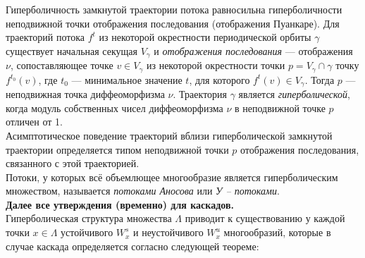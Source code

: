 \noindent Гиперболичность замкнутой траектории потока равносильна гиперболичности неподвижной точки отображения последования (отображения Пуанкаре).
Для траекторий потока \(f^t\) из некоторой окрестности периодической орбиты \(\gamma\) существует начальная секущая \(V_{\gamma}\) и 
\textit{отображения последования} --- отображения \(\nu\), сопоставляющее точке \(v \in V_{\gamma}\) из некоторой окрестности точки 
\(p = V_{\gamma} \cap \gamma\) точку \(f^{t_0}(v)\), где \(t_0\) --- минимальное значение \(t\),
для которого \(f^t(v) \in V_{\gamma}\). 
Тогда \(p\) --- неподвижная точка диффеоморфизма \(\nu\). Траектория \(\gamma\) является \textit{гиперболической},
когда модуль собственных чисел диффеоморфизма \(\nu\) в неподвижной точке \(p\) отличен от 1. 
\\[2mm]
Асимптотическое поведение траекторий вблизи гиперболической замкнутой траектории определяется типом неподвижной 
точки \(p\) отображения последования, связанного с этой траекторией. 
\\[2mm]
Потоки, у которых всё объемлющее многообразие является гиперболическим множеством, называется \textit{потоками Аносова}
или \textit{У -- потоками}. 
\\[2mm]
\textbf{Далее все утверждения (временно) для каскадов.}
\\[2mm]
Гиперболическая структура множества \(\Lambda\) приводит к существованию у каждой точки \(x \in \Lambda\) устойчивого
\(W_x^s\) и неустойчивого \(W_x^u\) многообразий, которые в случае каскада определяется согласно следующей теореме: 


